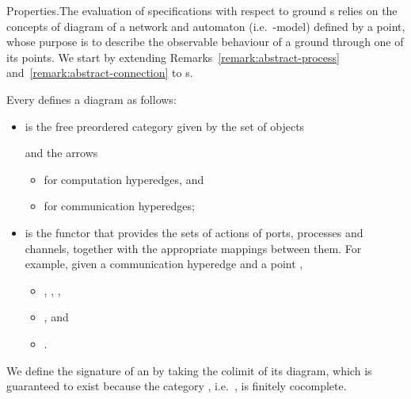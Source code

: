 \documentclass{LMCS}
\begin{document}
  \begin{minisection}{Properties.}The evaluation of specifications with respect to ground s relies on the concepts of diagram of a network and automaton (i.e.\ \nb-model) defined by a point, whose purpose is to describe the observable behaviour of a ground  through one of its points.
    We start by extending Remarks~\ref{remark:abstract-process} and~\ref{remark:abstract-connection} to s.

    \begin{fact}
      Every   defines a diagram  as follows:
      \begin{itemize}
        
      \item  is the free preordered category given by the set of objects
        
        and the arrows
        \begin{itemize}
          
        \item  for computation hyperedges, and
          
        \item  for communication hyperedges;
          
        \end{itemize}
        
      \item  is the functor that provides the sets of actions of ports, processes and channels, together with the appropriate mappings between them.
        For example, given a communication hyperedge  and a point ,
        \begin{itemize}
          
        \item , , ,
          
        \item , and
          
        \item .
          
        \end{itemize}
        
      \end{itemize}
    \end{fact}

\noindent     We define the signature of an  by taking the colimit of its diagram, which is guaranteed to exist because the category , i.e.\ , is finitely cocomplete.


\end{minisection}
\end{document}
